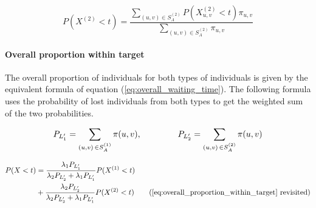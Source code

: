 \begin{equation}
    P(X^{(2)} < t) = \frac{\sum_{(u,v) \in S_A^{(2)}} P(X_{u,v}^{(2)} < t) 
    \pi_{u,v} }{\sum_{(u,v) \in S_A^{(2)}} \pi_{u,v}}
\end{equation}


\paragraph{Overall proportion within target}

The overall proportion of individuals for both types of individuals is given by 
the equivalent formula of equation (\ref{eq:overall_waiting_time}).
The following formula uses the probability of lost individuals from both types
to get the weighted sum of the two probabilities.

\begin{equation*}
    P_{L'_1} = \sum_{(u,v) \, \in S_A^{(1)}} \pi(u,v), \hspace{1.5cm}
    P_{L'_2} = \sum_{(u,v) \, \in S_A^{(2)}} \pi(u,v)
\end{equation*}

\begin{align}
    P(X < t) &= \frac{\lambda_1 P_{L'_1}}{\lambda_2 P_{L'_2}+\lambda_1 P_{L'_1}} 
    P(X^{(1)} < t) \nonumber \\
    &+ \frac{\lambda_2 P_{L'_2}}{\lambda_2 P_{L'_2} + \lambda_1 
    P_{L'_1}} P(X^{(2)} < t) 
    \tag{\ref{eq:overall_proportion_within_target} revisited}
\end{align}

